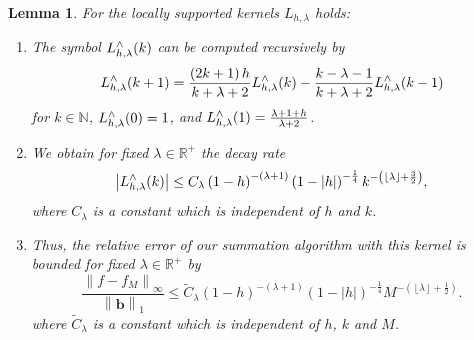 \documentclass[11pt,a4paper,twoside,bibtotoc]{scrartcl}
\theoremstyle{plain}
\newtheorem{lemma}[theorem]{Lemma}
\theoremstyle{definition}
\theoremstyle{remark}
\newcommand{\N}{\ensuremath{\mathbb{N}}}
\newcommand{\Rp}{\ensuremath{\mathbb{R}^{+}}}
\newcommand{\fun}[2]{\ensuremath{#1{\hspace{-0.4ex}}\left(#2\right)}}
\newcommand{\paren}[1]{\ensuremath{\left(#1\right)}}
\newcommand{\encl}[3]{\ensuremath{\left#1#2\right#3}}
\newcommand{\mb}[1]{\mathbf{#1}}
\newcommand{\V}[1]{\mb{#1}}
\newcommand{\floor}[1]{\encl{\lfloor}{#1}{\rfloor}}
\numberwithin{equation}{section}
\numberwithin{table}{section}
\numberwithin{figure}{section}
\begin{document}
\begin{lemma}
  For the locally supported kernels $L_{h,\lambda}$ holds:
  \begin{enumerate}
  \item The symbol $\fun{L_{h,\lambda}^{\wedge}}{k}$ can be computed recursively by
    \[
    \fun{L_{h,\lambda}^{\wedge}}{k+1} = \frac{\paren{2k+1} h}{k+\lambda+2}
    \fun{L_{h,\lambda}^{\wedge}}{k}   - \frac{k-\lambda-1}{k+\lambda+2}
    \fun{L_{h,\lambda}^{\wedge}}{k-1}
    \]
    for $k\in \N$, $\fun{L_{h,\lambda}^{\wedge}}{0} = 1$, and
    $\fun{L_{h,\lambda}^{\wedge}}{1} = \frac{\lambda + 1 + h}{\lambda+2}$.
  \item We obtain for fixed $\lambda \in \Rp$ the decay rate
    \[
    \left|\fun{L_{h,\lambda}^{\wedge}}{k}\right| \le C_{\lambda}
    \left(1-h\right)^{-(\lambda+1)}\paren{1-|h|}^{-\frac{1}{4}} 
    k^{-\paren{\floor{\lambda}+\frac{3}{2}}}, 
    \]
where $C_{\lambda}$ is a constant which is independent of $h$ and $k$.
  \item Thus, the relative error of our summation algorithm with this kernel
  is bounded for fixed $\lambda \in \Rp$ by
  \begin{equation}
    \label{error:Lh}
    \frac{\left\|f - f_{M}\right\|_{\infty}}{\left\|\V{b}\right\|_1} \le
    \tilde C_{\lambda} \left(1-h\right)^{-(\lambda+1)}\paren{1-|h|}^{-\frac{1}{4}} 
    M^{-\paren{\floor{\lambda}+\frac{1}{2}}}.
  \end{equation}
where $\tilde C_{\lambda}$ is a constant which is independent of $h$,
$k$ and $M$.
  \end{enumerate}
\end{lemma}
\end{document}

